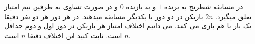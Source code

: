\exercise
در مسابقه شطرنج به برنده
$1$
و به بازنده
$0$
و در صورت تساوی به طرفین نیم امتیاز تعلق میگیرد.
$2n$
بازیکن در دو دور با یکدیگر مسابقه میدهند. در هر دور هر دو نفر دقیقا یک بار با هم بازی می کنند. می دانیم اختلاف امتیاز هر بازیکن در دور اول و دوم حداقل
$n$
است. ثابت کنید این اختلاف دقیقا
$n$
است.
